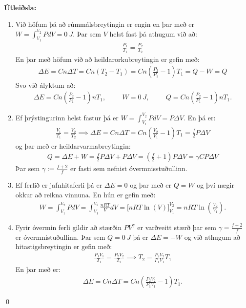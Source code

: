 \ifdefined \wholebook \else\documentclass[oneside]{book}\usepackage{EdlBook}\graphicspath{{figures/}}
\begin{document}
\textbf{Útleiðsla:} \begin{enumerate}[label = \textbf{(\alph*)}]
    \item Við höfum þá að rúmmálsbreytingin er engin en þar með er $W = \int_{V_1}^{V_2} P dV = \SI{0}{J}$. Þar sem $V$ helst fast þá athugum við að:
    \begin{align*}
        \frac{P_1}{T_1} = \frac{P_2}{T_2}
    \end{align*}
    En þar með höfum við að heildarorkubreytingin er gefin með:
    \begin{align*}
        \Delta E = Cn \Delta T = Cn \left(T_2 - T_1 \right) = C n \left( \frac{P_2}{P_1} - 1\right) T_1 = Q - W = Q
    \end{align*}
    Svo við ályktum að:
    \begin{align*}
        \Delta E = C n \left( \frac{P_2}{P_1} - 1 \right)nT_1, \hspace{1cm} W = \SI{0}{J}, \hspace{1cm} Q = C n \left( \frac{P_2}{P_1} - 1 \right)nT_1.
    \end{align*}
    
    \item Ef þrýstingurinn helst fastur þá er $W = \int_{V_1}^{V_2}PdV = P \Delta V$. En þá er:
    \begin{align*}
        \frac{V_1}{T_1} = \frac{V_2}{T_2} \implies \Delta E = Cn \Delta T = Cn \left( \frac{V_2}{V_1}-1 \right)T_1 = \frac{f}{2} P \Delta V
    \end{align*}
    og þar með er heildarvarmabreytingin:
    \begin{align*}
        Q = \Delta E + W = \frac{f}{2} P \Delta V + P\Delta V = \left(\frac{f}{2}+1\right) P \Delta V = \gamma C P\Delta V
    \end{align*}
    Þar sem $\gamma := \frac{f+2}{f}$ er fasti sem nefnist óvermnisstuðullinn.
    
    \item Ef ferlið er jafnhitaferli þá er $\Delta E = 0$ og þar með er $Q = W$ og því nægir okkur að reikna vinnuna. En hún er gefin með:
    \begin{align*}
        W = \int_{V_1}^{V_2} PdV = \int_{V_1}^{V_2} \frac{nRT}{V}dV = \Bigg[ nRT \ln(V) \Bigg]_{V_1}^{V_2} = nRT \ln(\frac{V_2}{V_1}).
    \end{align*}
    \item Fyrir óvermin ferli gildir að stærðin $PV^\gamma$ er varðveitt stærð þar sem $\gamma = \frac{f+2}{f}$ er óvermnistuðullinn. Þar sem $Q = \SI{0}{J}$ þá er $\Delta E = -W$ og við athugum að hitastigsbreytingin er gefin með:
    \begin{align*}
        \frac{P_1 V_1}{T_1} = \frac{P_2 V_2}{T_2} \implies T_2 = \frac{P_2 V_2}{P_1 V_1}T_1
    \end{align*}
    En þar með er:
    \begin{align*}
        \Delta E = Cn\Delta T = Cn \left( \frac{P_2 V_2}{P_1 V_1} - 1 \right)T_1.
    \end{align*}
\end{enumerate}
\qed
\end{document}
